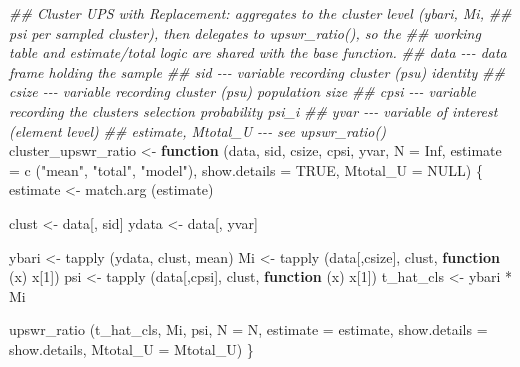 \documentclass[
  letterpaper,
  DIV=11,
  numbers=noendperiod]{scrreprt}
\newenvironment{Shaded}{\begin{snugshade}}{\end{snugshade}}
\newcommand{\AttributeTok}[1]{\textcolor[rgb]{0.40,0.45,0.13}{#1}}
\newcommand{\ConstantTok}[1]{\textcolor[rgb]{0.56,0.35,0.01}{#1}}
\newcommand{\ControlFlowTok}[1]{\textcolor[rgb]{0.00,0.23,0.31}{\textbf{#1}}}
\newcommand{\DecValTok}[1]{\textcolor[rgb]{0.68,0.00,0.00}{#1}}
\newcommand{\DocumentationTok}[1]{\textcolor[rgb]{0.37,0.37,0.37}{\textit{#1}}}
\newcommand{\FunctionTok}[1]{\textcolor[rgb]{0.28,0.35,0.67}{#1}}
\newcommand{\NormalTok}[1]{\textcolor[rgb]{0.00,0.23,0.31}{#1}}
\newcommand{\OtherTok}[1]{\textcolor[rgb]{0.00,0.23,0.31}{#1}}
\newcommand{\SpecialCharTok}[1]{\textcolor[rgb]{0.37,0.37,0.37}{#1}}
\newcommand{\StringTok}[1]{\textcolor[rgb]{0.13,0.47,0.30}{#1}}
\renewcommand{\[}{\begin{equation}}
\renewcommand{\]}{\end{equation}}
\begin{document}
\begin{Shaded}
\begin{Highlighting}[]
\DocumentationTok{\#\# Cluster UPS with Replacement: aggregates to the cluster level (ybari, Mi,}
\DocumentationTok{\#\# psi per sampled cluster), then delegates to upswr\_ratio(), so the}
\DocumentationTok{\#\# working table and estimate/total logic are shared with the base function.}
\DocumentationTok{\#\# data {-}{-}{-} data frame holding the sample}
\DocumentationTok{\#\# sid {-}{-}{-} variable recording cluster (psu) identity}
\DocumentationTok{\#\# csize {-}{-}{-} variable recording cluster (psu) population size}
\DocumentationTok{\#\# cpsi {-}{-}{-} variable recording the cluster\textquotesingle{}s selection probability psi\_i}
\DocumentationTok{\#\# yvar {-}{-}{-} variable of interest (element level)}
\DocumentationTok{\#\# estimate, Mtotal\_U {-}{-}{-} see upswr\_ratio()}
\NormalTok{cluster\_upswr\_ratio }\OtherTok{\textless{}{-}} \ControlFlowTok{function}\NormalTok{ (data, sid, csize, cpsi, yvar, }\AttributeTok{N =} \ConstantTok{Inf}\NormalTok{,}
                                  \AttributeTok{estimate =} \FunctionTok{c}\NormalTok{ (}\StringTok{"mean"}\NormalTok{, }\StringTok{"total"}\NormalTok{, }\StringTok{"model"}\NormalTok{),}
                                  \AttributeTok{show.details =} \ConstantTok{TRUE}\NormalTok{, }\AttributeTok{Mtotal\_U =} \ConstantTok{NULL}\NormalTok{)}
\NormalTok{\{}
\NormalTok{    estimate }\OtherTok{\textless{}{-}} \FunctionTok{match.arg}\NormalTok{ (estimate)}

\NormalTok{    clust }\OtherTok{\textless{}{-}}\NormalTok{ data[, sid]}
\NormalTok{    ydata }\OtherTok{\textless{}{-}}\NormalTok{ data[, yvar]}

\NormalTok{    ybari }\OtherTok{\textless{}{-}} \FunctionTok{tapply}\NormalTok{ (ydata, clust, mean)}
\NormalTok{    Mi }\OtherTok{\textless{}{-}} \FunctionTok{tapply}\NormalTok{ (data[,csize], clust, }\ControlFlowTok{function}\NormalTok{ (x) x[}\DecValTok{1}\NormalTok{])}
\NormalTok{    psi }\OtherTok{\textless{}{-}} \FunctionTok{tapply}\NormalTok{ (data[,cpsi], clust, }\ControlFlowTok{function}\NormalTok{ (x) x[}\DecValTok{1}\NormalTok{])}
\NormalTok{    t\_hat\_cls }\OtherTok{\textless{}{-}}\NormalTok{ ybari }\SpecialCharTok{*}\NormalTok{ Mi}

    \FunctionTok{upswr\_ratio}\NormalTok{ (t\_hat\_cls, Mi, psi, }\AttributeTok{N =}\NormalTok{ N, }\AttributeTok{estimate =}\NormalTok{ estimate,}
                 \AttributeTok{show.details =}\NormalTok{ show.details, }\AttributeTok{Mtotal\_U =}\NormalTok{ Mtotal\_U)}
\NormalTok{\}}


\end{Highlighting}
\end{Shaded}
\end{document}
